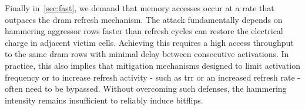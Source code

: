 \begin{description}
      Finally in~\cref{sec:fast}, we demand that memory accesses occur at a rate that outpaces 
      the \gls{dram} refresh mechanism. The attack fundamentally depends on hammering aggressor rows faster than refresh cycles can restore 
      the electrical charge in adjacent victim cells. Achieving this requires a high access throughput to the same 
      \gls{dram} rows with minimal delay between consecutive activations. In practice, this also implies that mitigation 
      mechanisms designed to limit activation frequency or to increase refresh activity - such as \gls{trr} 
      or an increased refresh rate - often need to be bypassed. Without overcoming such defenses, the hammering 
      intensity remains insufficient to reliably induce bitflips.
  \end{description}
  